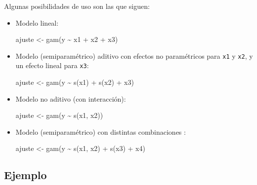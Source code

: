 \documentclass[
  spanish,
]{book}
\newenvironment{Shaded}{\begin{snugshade}}{\end{snugshade}}
\newcommand{\FunctionTok}[1]{\textcolor[rgb]{0.00,0.00,0.00}{#1}}
\newcommand{\NormalTok}[1]{#1}
\newcommand{\OtherTok}[1]{\textcolor[rgb]{0.56,0.35,0.01}{#1}}
\newcommand{\SpecialCharTok}[1]{\textcolor[rgb]{0.00,0.00,0.00}{#1}}
\theoremstyle{break}
\theoremstyle{definition}
\theoremstyle{definition}
\theoremstyle{definition}
\theoremstyle{definition}
\theoremstyle{remark}
\begin{document}
Algunas posibilidades de uso son las que siguen:

\begin{itemize}
\item
  Modelo lineal:

\begin{Shaded}
\begin{Highlighting}[]
\NormalTok{ajuste }\OtherTok{\textless{}{-}} \FunctionTok{gam}\NormalTok{(y }\SpecialCharTok{\textasciitilde{}}\NormalTok{ x1 }\SpecialCharTok{+}\NormalTok{ x2 }\SpecialCharTok{+}\NormalTok{ x3)}
\end{Highlighting}
\end{Shaded}
\item
  Modelo (semiparamétrico) aditivo con efectos no paramétricos para \texttt{x1} y \texttt{x2}, y un efecto lineal para \texttt{x3}:

\begin{Shaded}
\begin{Highlighting}[]
\NormalTok{ajuste }\OtherTok{\textless{}{-}} \FunctionTok{gam}\NormalTok{(y }\SpecialCharTok{\textasciitilde{}} \FunctionTok{s}\NormalTok{(x1) }\SpecialCharTok{+} \FunctionTok{s}\NormalTok{(x2) }\SpecialCharTok{+}\NormalTok{ x3)}
\end{Highlighting}
\end{Shaded}
\item
  Modelo no aditivo (con interacción):

\begin{Shaded}
\begin{Highlighting}[]
\NormalTok{ajuste }\OtherTok{\textless{}{-}} \FunctionTok{gam}\NormalTok{(y }\SpecialCharTok{\textasciitilde{}} \FunctionTok{s}\NormalTok{(x1, x2))}
\end{Highlighting}
\end{Shaded}
\item
  Modelo (semiparamétrico) con distintas combinaciones :

\begin{Shaded}
\begin{Highlighting}[]
\NormalTok{ajuste }\OtherTok{\textless{}{-}} \FunctionTok{gam}\NormalTok{(y }\SpecialCharTok{\textasciitilde{}} \FunctionTok{s}\NormalTok{(x1, x2) }\SpecialCharTok{+} \FunctionTok{s}\NormalTok{(x3) }\SpecialCharTok{+}\NormalTok{ x4)}
\end{Highlighting}
\end{Shaded}
\end{itemize}

\hypertarget{ejemplo-3}{%
\subsection{Ejemplo}\label{ejemplo-3}}
\end{document}
